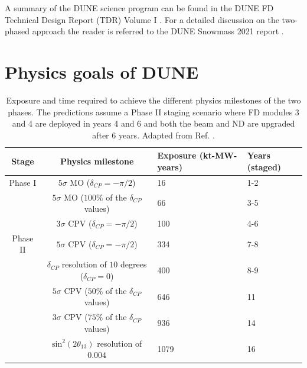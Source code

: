 A summary of the DUNE science program can be found in the DUNE FD Technical Design Report (TDR) Volume I \cite{DUNE2020TDR1}. For a detailed discussion on the two-phased approach the reader is referred to the DUNE Snowmass 2021 report \cite{DUNE2022Snowmass}.

\section{Physics goals of DUNE}

\begin{table}[]
	\caption[Exposure and time required to achieve the different physics milestones of the two phases.]{Exposure and time required to achieve the different physics milestones of the two phases. The predictions assume a Phase II staging scenario where FD modules 3 and 4 are deployed in years 4 and 6 and both the beam and ND are upgraded after 6 years. Adapted from Ref. \cite{DUNE2022Snowmass}.}
	\centering
	\begin{tabular}{c|c|C{3.0cm}|C{2.0cm}}
	Stage    & Physics milestone                                          & Exposure (kt-MW-years) & Years (staged) \\[3mm] \hline
	\rule{0pt}{1.1\normalbaselineskip}Phase I  & $5\sigma$ MO ($\delta_{CP} = -\pi/2$)                      & 16                     & 1-2            \\[1mm]
			 & $5\sigma$ MO ($100\%$ of the $\delta_{CP}$ values)         & 66                     & 3-5            \\[1mm]
			 & $3\sigma$ CPV ($\delta_{CP} = -\pi/2$)                     & 100                    & 4-6            \\[1mm] \hline
			 \rule{0pt}{1.1\normalbaselineskip}Phase II & $5\sigma$ CPV ($\delta_{CP} = -\pi/2$)                     & 334                    & 7-8            \\[1mm]
			 & $\delta_{CP}$ resolution of $10$ degrees ($\delta_{CP}=0$) & 400                    & 8-9            \\[1mm]
			 & $5\sigma$ CPV ($50\%$ of the $\delta_{CP}$ values)         & 646                    & 11             \\[1mm]
			 & $3\sigma$ CPV ($75\%$ of the $\delta_{CP}$ values)         & 936                    & 14             \\[1mm]
			 & $\mathrm{sin}^{2}(2\theta_{13})$ resolution of $0.004$       & 1079                   & 16            
	\end{tabular}
	\label{tab:dune_phases_physics}
\end{table}

